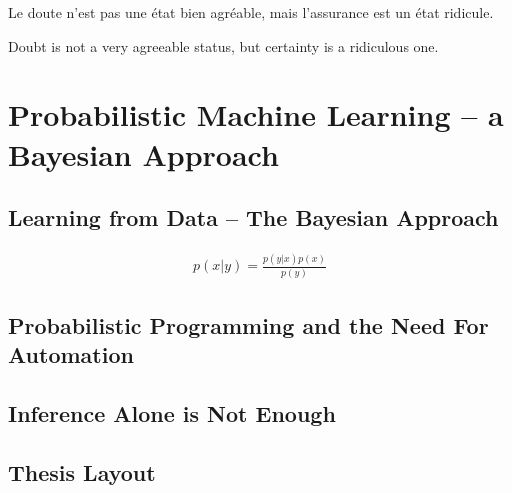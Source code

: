 
\begin{savequote}[8cm]
	\textlatin{Le doute n'est pas une état bien agréable, mais l'assurance est un état ridicule.}
	
	Doubt is not a very agreeable status, but certainty is a ridiculous one.
\end{savequote}

\chapter{Probabilistic Machine Learning -- a Bayesian Approach}
\label{sec:intro}




\section{Learning from Data -- The Bayesian Approach}

\begin{align}
	\label{eq:bayes}
	p(x|y) = \frac{p(y|x)p(x)}{p(y)}
\end{align}

\section{Probabilistic Programming and the Need For Automation}

\section{Inference Alone is Not Enough}

\section{Thesis Layout}